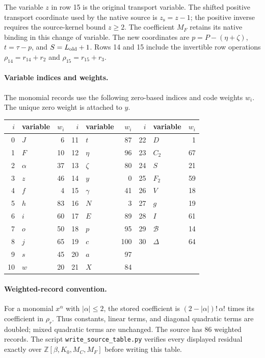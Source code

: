 \endgroup
The variable $z$ in row 15 is the original transport variable.  The shifted
positive transport coordinate used by the native source is $z_{\mathrm s}=z-1$;
the positive inverse requires the source-kernel bound $z\geq2$.  The coefficient
$M_F$ retains its native binding in this change of variable.
The new coordinates are $p=P-(\eta+\zeta)$, $t=\tau-p$, and $S=L_{\rm old}+1$.
Rows 14 and 15 include the invertible row operations
$\rho_{14}=r_{14}+r_2$ and $\rho_{15}=r_{15}+r_3$.
\paragraph{Variable indices and weights.}
The monomial records use the following zero-based indices and code weights $w_i$.
The unique zero weight is attached to $y$.
\begin{center}
\begin{tabular}{@{}r l r@{\qquad}r l r@{\qquad}r l r@{}}
\hline
$i$ & variable & $w_i$ & $i$ & variable & $w_i$ & $i$ & variable & $w_i$\\
\hline
0 & $J$ & 6 & 11 & $t$ & 87 & 22 & $D$ & 1\\
1 & $F$ & 10 & 12 & $\eta$ & 96 & 23 & $C_2$ & 67\\
2 & $\alpha$ & 37 & 13 & $\zeta$ & 80 & 24 & $S$ & 21\\
3 & $z$ & 46 & 14 & $y$ & 0 & 25 & $F_2$ & 59\\
4 & $f$ & 4 & 15 & $\gamma$ & 41 & 26 & $V$ & 18\\
5 & $h$ & 83 & 16 & $N$ & 3 & 27 & $g$ & 19\\
6 & $i$ & 60 & 17 & $E$ & 89 & 28 & $I$ & 61\\
7 & $o$ & 50 & 18 & $p$ & 95 & 29 & $\mathcal B$ & 14\\
8 & $j$ & 65 & 19 & $c$ & 100 & 30 & $\Delta$ & 64\\
9 & $s$ & 45 & 20 & $a$ & 97 &  &  & \\
10 & $w$ & 20 & 21 & $X$ & 84 &  &  & \\
\hline
\end{tabular}
\end{center}
\paragraph{Weighted-record convention.}
For a monomial $x^\alpha$ with $|\alpha|\leq2$, the stored coefficient is
$(2-|\alpha|)!\,\alpha!$ times its coefficient in $\rho_r$.  Thus constants,
linear terms, and diagonal quadratic terms are doubled; mixed quadratic
terms are unchanged.  The source has 86 weighted records.  The script
\texttt{write\_source\_table.py} verifies every displayed residual exactly over
$\mathbb Z[\beta,K_0,M_C,M_F]$ before writing this table.
